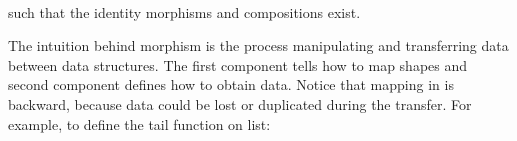 \begin{code}%
\>[0]\AgdaSpace{}%
\AgdaSpace{}%
\AgdaSymbol{(}\AgdaSpace{}%
\AgdaSpace{}%
\AgdaSymbol{:}\AgdaSpace{}%
\AgdaSymbol{)}\AgdaSpace{}%
\AgdaSymbol{:}\AgdaSpace{}%
\AgdaSpace{}%
\<%
\\
\>[0][@{}l@{\AgdaIndent{0}}]%
\>[2]\AgdaSpace{}%
\<%
\\
%
\>[2]\AgdaSpace{}%
\AgdaSpace{}%
\<%
\\
%
\>[2]\AgdaSpace{}%
\AgdaSpace{}%
\AgdaSpace{}%
\AgdaSpace{}%
\AgdaSymbol{(}\AgdaSpace{}%
\AgdaSpace{}%
\AgdaSymbol{;}\AgdaSpace{}%
\AgdaSpace{}%
\AgdaSpace{}%
\AgdaSymbol{)}\<%
\\
%
\>[2]\<%
\\
\>[2][@{}l@{\AgdaIndent{0}}]%
\>[4]\AgdaSpace{}%
\AgdaSymbol{:}\AgdaSpace{}%
\AgdaSpace{}%
\AgdaSpace{}%
\<%
\\
%
\>[4]\AgdaSpace{}%
\AgdaSymbol{:}\AgdaSpace{}%
\AgdaSymbol{(}\AgdaSpace{}%
\AgdaSymbol{:}\AgdaSpace{}%
\AgdaSymbol{)}\AgdaSpace{}%
\AgdaSpace{}%
\AgdaSpace{}%
\AgdaSymbol{(}\AgdaSpace{}%
\AgdaSymbol{)}\AgdaSpace{}%
\AgdaSpace{}%
\AgdaSpace{}%
\<%
\end{code}

such that the identity morphisms and compositions exist.

The intuition behind morphism is the process manipulating and transferring data between data structures. The first component  tells how to map shapes and second component  defines how to obtain data. Notice that mapping in  is backward, because data could be lost or duplicated during the transfer. For example, to define the tail function on list:

